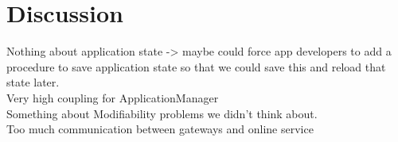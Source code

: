 \section{Discussion}
    Nothing about application state -> maybe could force app developers to add a procedure to save application state so that we could save this and reload that state later.\\
    Very high coupling for ApplicationManager\\
    Something about Modifiability problems we didn't think about.\\
    Too much communication between gateways and online service
